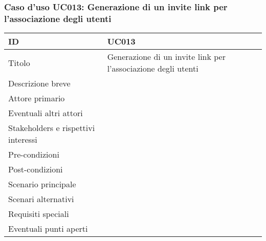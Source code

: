 \documentclass[../../main.tex]{subfiles}
\begin{document}
\subsubsection{Caso d’uso UC013: Generazione di un invite link per l'associazione degli utenti }
\begin{tabularx}{150mm}{|l|X|}
    \hline
    ID                                  & \textbf{UC013}\\
    \hline
    Titolo                              & Generazione di un invite link per l'associazione degli utenti \\
    \hline
    Descrizione breve                   &    \\
    \hline
    Attore primario                     &    \\
    \hline
    Eventuali altri attori              &    \\
    \hline
    Stakeholders e rispettivi interessi &    \\
    \hline
    Pre-condizioni                      &    \\
    \hline
    Post-condizioni                     &    \\
    \hline
    Scenario principale                 &    \\
    \hline
    Scenari alternativi                 &    \\
    \hline
    Requisiti speciali                  &    \\
    \hline
    Eventuali punti aperti              &    \\
    \hline
\end{tabularx}
\newpage
\end{document}
